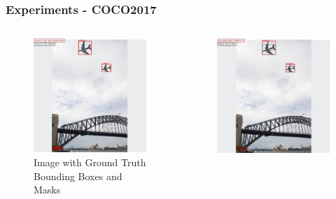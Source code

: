 \documentclass{beamer}
\begin{document}
\begin{frame}[t]
  \scriptsize
  \frametitle{Experiments - COCO2017}
  \begin{columns}
      \begin{column}{0.5\textwidth}
      \centering
      \begin{figure}
        \includegraphics[scale=0.22]{Figures/coco_ground_truth.jpg}
        \caption{Image with Ground Truth Bounding Boxes and Masks}
        \label{fig:pre-process}
      \end{figure}
    \end{column}
    \begin{column}{0.5\textwidth}
      \centering
      \begin{figure}
        \includegraphics[scale=0.22]{Figures/coco_predictions.jpg}

\end{figure}
\end{column}
\end{columns}
\end{frame}
\end{document}
